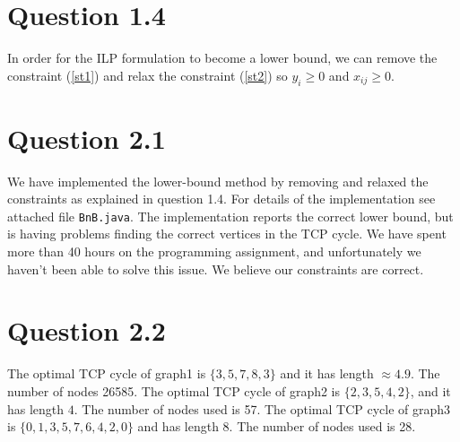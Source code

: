 \documentclass[10pt]{article}
\begin{document}

\section*{Question 1.4} %
\label{sec:question_1_4}
In order for the ILP formulation to become a lower bound, we can remove the constraint (\ref{st1}) and relax the constraint (\ref{st2}) so $y_i \geq 0$ and $x_{ij} \geq 0$.

\section*{Question 2.1} %
\label{sec:question_2_1}
We have implemented the lower-bound method by removing and relaxed the constraints as explained in question 1.4. For details of the implementation see attached file \texttt{BnB.java}. The implementation reports the correct lower bound, but is having problems finding the correct vertices in the TCP cycle. We have spent more than 40 hours on the programming assignment, and unfortunately we haven't been able to solve this issue. We believe our constraints are correct.

\section*{Question 2.2} %
\label{sec:question_2_2}
The optimal TCP cycle of graph1 is $\{3,5,7,8,3\}$ and it has length $\approx 4.9$. The number of nodes 26585. The optimal TCP cycle of graph2 is $\{2,3,5,4,2\}$, and it has length $4$. The number of nodes used is 57. The optimal TCP cycle of graph3 is $\{0,1,3,5,7,6,4,2,0\}$ and has length $8$. The number of nodes used is 28.



%
%
\end{document}
